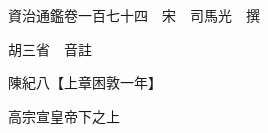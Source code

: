 










 


 
 


 

  
  
  
  
  





  
  
  
  
  
 
  

  

  
  
  



  

 
 

  
   




  

  
  


  　　資治通鑑卷一百七十四　宋　司馬光　撰

　　胡三省　音註

　　陳紀八【上章困敦一年】

　　高宗宣皇帝下之上

